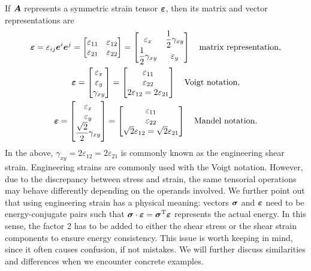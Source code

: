 If $\bm{A}$ represents a symmetric strain tensor $\bm{\varepsilon}$, then its matrix and vector representations are
\begin{gather}
\bm{\varepsilon}=\varepsilon_{ij}\bm{e}^i\bm{e}^j=\begin{bmatrix}
\varepsilon_{11}&\varepsilon_{12}\\
\varepsilon_{21}&\varepsilon_{22}
\end{bmatrix}=\begin{bmatrix}
\varepsilon_x&\dfrac{1}{2}\gamma_{xy}\\
\dfrac{1}{2}\gamma_{xy}&\varepsilon_y
\end{bmatrix}\quad\text{matrix representation},\\
\bm{\varepsilon}=\begin{bmatrix}
\varepsilon_x\\\varepsilon_y\\\gamma_{xy}
\end{bmatrix}=\begin{bmatrix}
\varepsilon_{11}\\\varepsilon_{22}\\2\varepsilon_{12}=2\varepsilon_{21}
\end{bmatrix}\quad\text{Voigt notation},\\
\bm{\varepsilon}=\begin{bmatrix}
\varepsilon_x\\\varepsilon_y\\\dfrac{\sqrt{2}}{2}\gamma_{xy}
\end{bmatrix}=\begin{bmatrix}
\varepsilon_{11}\\\varepsilon_{22}\\\sqrt{2}\varepsilon_{12}=\sqrt{2}\varepsilon_{21}
\end{bmatrix}\quad\text{Mandel notation}.
\end{gather}
In the above, $\gamma_{xy}=2\varepsilon_{12}=2\varepsilon_{21}$ is commonly known as the engineering shear strain.
Engineering strains are commonly used with the Voigt notation.
However, due to the discrepancy between stress and strain, the same tensorial operations may behave differently depending on the operands involved.
We further point out that using engineering strain has a physical meaning: vectors $\bm{\sigma}$ and $\bm{\varepsilon}$ need to be energy-conjugate pairs such that $\bm{\sigma}\cdot\bm{\varepsilon}=\bm{\sigma}^{\mathrm{T}}\bm{\varepsilon}$ represents the actual energy.
In this sense, the factor \num{2} has to be added to either the shear stress or the shear strain components to ensure energy consistency.
This issue is worth keeping in mind, since it often causes confusion, if not mistakes.
We will further discuss similarities and differences when we encounter concrete examples.


